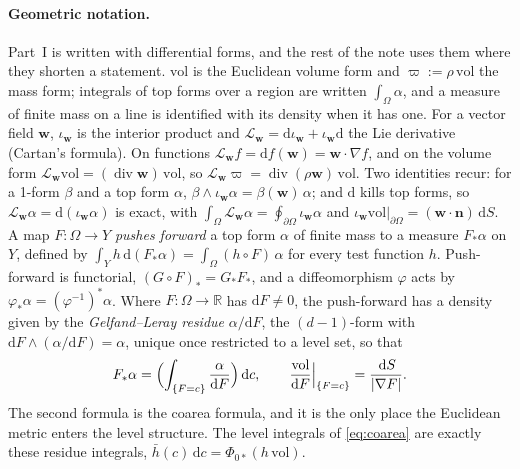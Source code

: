 \documentclass[11pt]{article}
\theoremstyle{definition}
\theoremstyle{remark}
\newcommand{\R}{\mathbb{R}}
\newcommand{\bw}{\mathbf{w}}
\newcommand{\bn}{\mathbf{n}}
\newcommand{\dS}{\,\mathrm{d}S}
\newcommand{\dc}{\,\mathrm{d}c}
\newcommand{\Div}{\operatorname{div}}
\newcommand{\vol}{\mathrm{vol}}
\begin{document}
\paragraph{Geometric notation.} Part~I is written with differential
forms, and the rest of the note uses them where they shorten a
statement. $\vol$ is the Euclidean volume form and $\varpi := \rho\,\vol$
the mass form; integrals of top forms over a region are written
$\int_\Omega\alpha$, and a measure of finite mass on a line is
identified with its density when it has one. For a vector field
$\bw$, $\iota_{\bw}$ is the interior product and $\mathcal L_{\bw} =
\mathrm d\iota_{\bw} + \iota_{\bw}\mathrm d$ the Lie derivative
(Cartan's formula). On functions $\mathcal L_{\bw}f = \mathrm
df(\bw) = \bw\cdot\nabla f$, and on the volume form $\mathcal
L_{\bw}\vol = (\Div\bw)\,\vol$, so $\mathcal L_{\bw}\varpi =
\Div(\rho\bw)\,\vol$. Two identities recur: for a 1-form $\beta$ and a
top form $\alpha$, $\beta\wedge\iota_{\bw}\alpha = \beta(\bw)\,\alpha$;
and $\mathrm d$ kills top forms, so $\mathcal L_{\bw}\alpha = \mathrm
d(\iota_{\bw}\alpha)$ is exact, with $\int_\Omega\mathcal
L_{\bw}\alpha = \oint_{\partial\Omega}\iota_{\bw}\alpha$ and
$\iota_{\bw}\vol|_{\partial\Omega} = (\bw\cdot\bn)\dS$. A map $F:
\Omega \to Y$ \emph{pushes forward} a top form $\alpha$ of finite
mass to a measure $F_*\alpha$ on $Y$, defined by $\int_Y
h\,\mathrm d(F_*\alpha) = \int_\Omega(h\circ F)\,\alpha$ for every
test function $h$. Push-forward is functorial, $(G\circ F)_* =
G_*F_*$, and a diffeomorphism $\varphi$ acts by $\varphi_*\alpha =
(\varphi^{-1})^*\alpha$. Where $F: \Omega \to \R$ has $\mathrm dF \ne
0$, the push-forward has a density given by the \emph{Gelfand--Leray
residue} $\alpha/\mathrm dF$, the $(d-1)$-form with $\mathrm dF\wedge
(\alpha/\mathrm dF) = \alpha$, unique once restricted to a level set,
so that
\begin{equation*}
  F_*\alpha = \Bigl(\int_{\{F = c\}}\frac{\alpha}{\mathrm dF}\Bigr)\dc ,
  \qquad
  \frac{\vol}{\mathrm dF}\Big|_{\{F = c\}} = \frac{\dS}{|\nabla F|} .
\end{equation*}
The second formula is the coarea formula, and it is the only place the
Euclidean metric enters the level structure. The level integrals of
\eqref{eq:coarea} are exactly these residue integrals, $\bar h(c)\dc =
\Phi_{0*}(h\,\vol)$.
\end{document}
